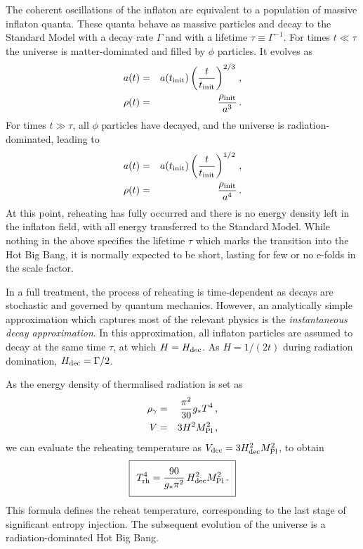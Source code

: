 The coherent oscillations of the inflaton are equivalent to a population of massive inflaton quanta. These quanta behave as massive particles and decay to the Standard Model
with a decay rate $\Gamma$ and with a lifetime $\tau \equiv \Gamma^{-1}$. For times $t \ll \tau$ the universe is matter-dominated and 
filled by $\phi$ particles. It evolves as
\begin{eqnarray}
a(t) & = & a(t_{\rm init}) \left( \frac{t}{t_{\rm init}} \right)^{2/3}\,, \\
\rho(t) & = & \frac{\rho_{\rm init}}{a^3}\,.
\end{eqnarray}
For times $t \gg \tau$, all $\phi$ particles have decayed, and the universe is radiation-dominated, leading to
\begin{eqnarray}
a(t) & = & a(t_{\rm init}) \left( \frac{t}{t_{\rm init}} \right)^{1/2}\,,  \\
\rho(t) & = & \frac{\rho_{\rm init}}{a^4}\,.
\end{eqnarray}
At this point, reheating has fully occurred and there is no energy density left in the inflaton field, with all energy transferred to the Standard Model. While nothing in the above specifies the lifetime $\tau$ which marks the transition into the Hot Big Bang, it is normally expected to be short, lasting for few or no e-folds in the scale factor.

In a full treatment, the process of reheating is time-dependent as decays are stochastic and governed by quantum mechanics.
However, an analytically simple approximation which captures most of the relevant physics is the \emph{instantaneous decay approximation}. In this approximation, all inflaton particles are assumed to decay at the same time $\tau$, at which $H = H_{\rm dec}$. As $H = 1/(2t)$ during radiation domination, $H_{\rm dec} = \Gamma/2$.

As the energy density of thermalised radiation is set as
\begin{eqnarray}
\rho_\gamma & = & \frac{\pi^2}{30} g_* T^4\,, \\
V & = & 3 H^2 M_{\rm Pl}^2\,,
\end{eqnarray}
we can evaluate the reheating temperature as $V_{\rm dec} = 3 H_{\rm dec}^2 M_{\rm Pl}^2$, to obtain
\begin{equation}
\setlength\fboxsep{0.25cm}
\setlength\fboxrule{0.4pt}
\boxed{
T_{\rm rh}^4 = \frac{90}{g_* \pi^2}\,H_{\rm dec}^2 M_{\rm Pl}^2\,.
}
\end{equation}
This formula defines the reheat temperature, corresponding to the last stage of significant entropy injection. The subsequent evolution of the universe is a radiation-dominated Hot Big Bang. 

